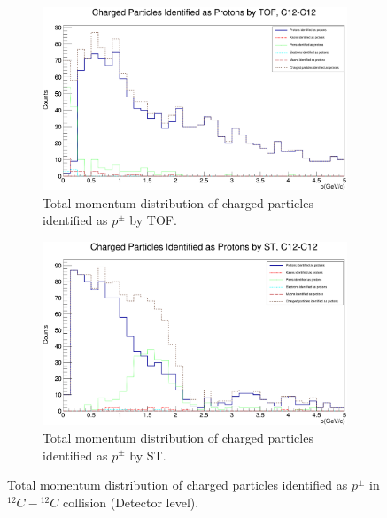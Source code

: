 \documentclass[12pt, twocolumn]{article}
\begin{document}
\begin{figure}[h]
\centering
\begin{subfigure}[h]{0.49\textwidth}
\centering
\includegraphics[scale=0.14]{Detector_pToT_protons(tof)_C12.png}
\caption{Total momentum distribution of charged particles identified as $p^{\pm}$ by TOF.}
\label{Detector - Total momentum distribution of protons (TOF) C12.}
\end{subfigure}
\hfill
\begin{subfigure}[h]{0.49\textwidth}
\centering
\includegraphics[scale=0.14]{Detector_pToT_protons(st)_C12.png}
\caption{Total momentum distribution of charged particles identified as $p^{\pm}$ by ST.}
\label{Detector - Total momentum distribution of protons (ST) C12.}
\end{subfigure}
\caption{Total momentum distribution of charged particles identified as $p^{\pm}$ in $^{12}C-{^{12}C}$ collision (Detector level).}
\label{Total momentum distribution of charged particles identified as protons in C12-C12 collision.}
\end{figure}
\end{document}
